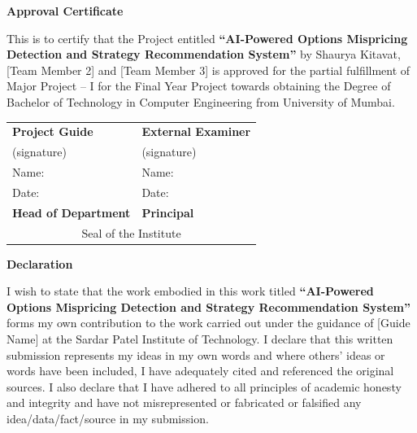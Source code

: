\documentclass[12pt,a4paper]{article}
\begin{document}
\newpage
\thispagestyle{fancy}
\begin{center}
{\Large \textbf{Approval Certificate}}\\[1cm]
\end{center}

This is to certify that the Project entitled \textbf{``AI-Powered Options Mispricing Detection and Strategy Recommendation System''} by Shaurya Kitavat, [Team Member 2] and [Team Member 3] is approved for the partial fulfillment of Major Project -- I for the Final Year Project towards obtaining the Degree of Bachelor of Technology in Computer Engineering from University of Mumbai.

\vspace{2cm}

\begin{tabular}{p{} p{}}
\textbf{Project Guide} & \textbf{External Examiner} \\[1.5cm]
(signature) & (signature) \\[0.8cm]
Name: & Name: \\[0.5cm]
Date: & Date: \\[2cm]
\textbf{Head of Department} & \textbf{Principal} \\[1.5cm]
\multicolumn{2}{c}{Seal of the Institute}
\end{tabular}

\newpage
\thispagestyle{fancy}
\begin{center}
{\Large \textbf{Declaration}}\\[1cm]
\end{center}

I wish to state that the work embodied in this work titled \textbf{``AI-Powered Options Mispricing Detection and Strategy Recommendation System''} forms my own contribution to the work carried out under the guidance of [Guide Name] at the Sardar Patel Institute of Technology. I declare that this written submission represents my ideas in my own words and where others' ideas or words have been included, I have adequately cited and referenced the original sources. I also declare that I have adhered to all principles of academic honesty and integrity and have not misrepresented or fabricated or falsified any idea/data/fact/source in my submission.
\end{document}

